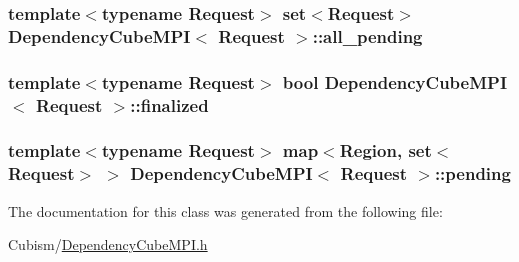 \subsubsection[{all\+\_\+pending}]{\setlength{\rightskip}{0pt plus 5cm}template$<$typename Request$>$ set$<$Request$>$ {\bf Dependency\+Cube\+M\+P\+I}$<$ Request $>$\+::all\+\_\+pending}\label{class_dependency_cube_m_p_i_a4996ead8bdfbf954562d0177b6c24607}
\hypertarget{class_dependency_cube_m_p_i_a79cbdbeafcdad83edcfe7bfb786e8dbb}{}
\subsubsection[{finalized}]{\setlength{\rightskip}{0pt plus 5cm}template$<$typename Request$>$ bool {\bf Dependency\+Cube\+M\+P\+I}$<$ Request $>$\+::finalized}\label{class_dependency_cube_m_p_i_a79cbdbeafcdad83edcfe7bfb786e8dbb}
\hypertarget{class_dependency_cube_m_p_i_a15e719dff5340ab953286ba4b9301a54}{}
\subsubsection[{pending}]{\setlength{\rightskip}{0pt plus 5cm}template$<$typename Request$>$ map$<${\bf Region}, set$<$Request$>$ $>$ {\bf Dependency\+Cube\+M\+P\+I}$<$ Request $>$\+::pending}\label{class_dependency_cube_m_p_i_a15e719dff5340ab953286ba4b9301a54}


The documentation for this class was generated from the following file\+:\begin{DoxyCompactItemize}
\item 
Cubism/\hyperlink{_dependency_cube_m_p_i_8h}{Dependency\+Cube\+M\+P\+I.\+h}\end{DoxyCompactItemize}
